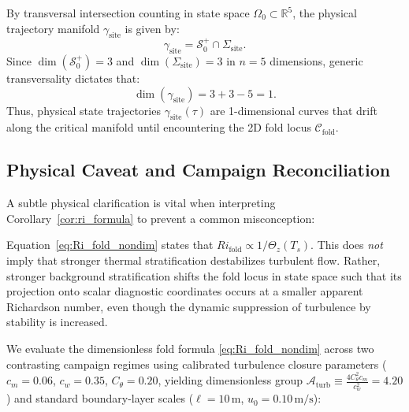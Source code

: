 By transversal intersection counting in state space $\Omega_0 \subset \mathbb{R}^5$, the physical trajectory manifold $\gamma_{\mathrm{site}}$ is given by:
\begin{equation}
\gamma_{\mathrm{site}} = \mathcal{S}_0^+ \cap \Sigma_{\mathrm{site}}.
\end{equation}
Since $\dim(\mathcal{S}_0^+) = 3$ and $\dim(\Sigma_{\mathrm{site}}) = 3$ in $n = 5$ dimensions, generic transversality dictates that:
\begin{equation}
\dim(\gamma_{\mathrm{site}}) = 3 + 3 - 5 = 1.
\end{equation}
Thus, physical state trajectories $\gamma_{\mathrm{site}}(\tau)$ are 1-dimensional curves that drift along the critical manifold until encountering the 2D fold locus $\mathcal{C}_{\mathrm{fold}}$.

\subsection{Physical Caveat and Campaign Reconciliation}

A subtle physical clarification is vital when interpreting Corollary~\ref{cor:ri_formula} to prevent a common misconception:

\begin{remark}
Equation~\eqref{eq:Ri_fold_nondim} states that $Ri_{\mathrm{fold}} \propto 1/\Theta_z(T_s)$. This does \emph{not} imply that stronger thermal stratification destabilizes turbulent flow. Rather, stronger background stratification shifts the fold locus in state space such that its projection onto scalar diagnostic coordinates occurs at a smaller apparent Richardson number, even though the dynamic suppression of turbulence by stability is increased.
\end{remark}

We evaluate the dimensionless fold formula \eqref{eq:Ri_fold_nondim} across two contrasting campaign regimes using calibrated turbulence closure parameters ($c_m = 0.06$, $c_w = 0.35$, $C_\theta = 0.20$, yielding dimensionless group $\mathcal{A}_{\mathrm{turb}} \equiv \frac{4 C_\theta^2 c_m}{c_w^2} = 4.20$) and standard boundary-layer scales ($\ell = 10\,\text{m}$, $u_0 = 0.10\,\text{m/s}$):

